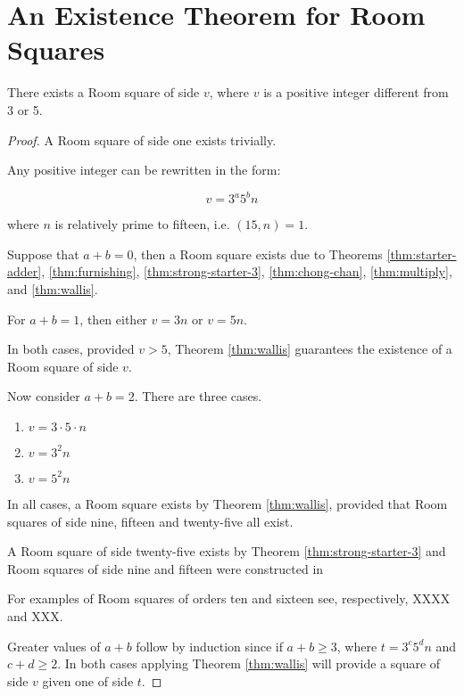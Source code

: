 \chapter{An Existence Theorem for Room Squares}

\begin{theorem}
There exists a Room square of side $v$, where $v$ is a positive integer different from 3 or 5.
\end{theorem}

\begin{proof}
A Room square of side one exists trivially.

Any positive integer can be rewritten in the form:

\begin{equation}
v = 3^{a}5^{b}n
\end{equation}

where $n$ is relatively prime to fifteen, i.e.  $(15, n) = 1$.

Suppose that $a + b = 0$, then a Room square exists due to Theorems
\ref{thm:starter-adder},
\ref{thm:furnishing},
\ref{thm:strong-starter-3},
\ref{thm:chong-chan},
\ref{thm:multiply},
and
\ref{thm:wallis}.

For $a + b = 1$, then either $v = 3n$ or $v = 5n$.

In both cases, provided $v > 5$, Theorem \ref{thm:wallis} guarantees the existence of a Room square of side $v$.

Now consider $a + b = 2$.
There are three cases.

\begin{enumerate}
  \item{$v = 3\cdot 5\cdot n$}
  \item{$v = 3^{2}n$}
  \item{$v = 5^{2}n$}
\end{enumerate}

In all cases, a Room square exists by Theorem \ref{thm:wallis}, provided that Room squares of side nine, fifteen and twenty-five all exist.

A Room square of side twenty-five exists by Theorem \ref{thm:strong-starter-3} and Room squares of side nine and fifteen were constructed in
\cite{mullinFurnishingRoomSquares1969}

For examples of Room squares of orders ten and sixteen see, respectively, XXXX and XXX.

Greater values of $a + b$ follow by induction since if $a + b \geq 3$, where $t = 3^{c}5^{d}n$ and $c + d \geq 2$.
In both cases applying Theorem \ref{thm:wallis} will provide a square of side $v$ given one of side $t$.

\end{proof}
